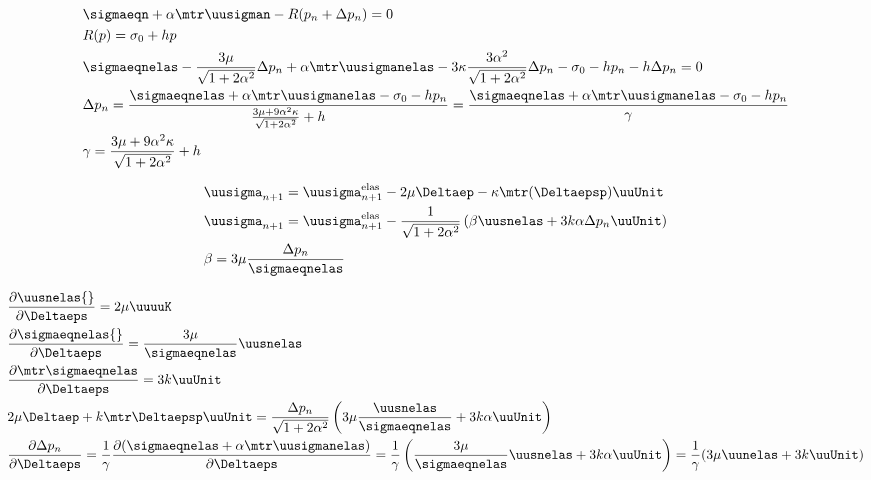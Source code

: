 \documentclass[12pt]{article}
\begin{document}
\begin{align}
    & \sigmaeqn + \alpha \mtr \uusigman - R(p_n + \Delta p_n) = 0 \\
    & R(p) = \sigma_0 + h p \\
    & \sigmaeqnelas - \frac{3\mu}{\sqrt{1 + 2\alpha^2}}\Delta p_n + \alpha \mtr \uusigmanelas - 3\kappa \frac{3\alpha^2}{\sqrt{1 + 2\alpha^2}} \Delta p_n - \sigma_0 - h p_n - h \Delta p_n = 0 \\
    & \Delta p_n = \frac{ \sigmaeqnelas + \alpha \mtr \uusigmanelas - \sigma_0 - h p_n}{ \frac{3\mu + 9\alpha^2\kappa}{\sqrt{1 + 2\alpha^2}} + h} = \frac{ \sigmaeqnelas + \alpha \mtr \uusigmanelas - \sigma_0 - h p_n}{ \gamma } \\
    & \gamma = \frac{3\mu + 9\alpha^2\kappa}{\sqrt{1 + 2\alpha^2}} + h
\end{align}

\begin{align}
    & \uusigma_{n+1} = \uusigma_{n+1}^\text{elas} - 2\mu \Deltaep - \kappa \mtr (\Deltaepsp) \uuUnit \\
    & \uusigma_{n+1} = \uusigma_{n+1}^\text{elas} - \frac{1}{\sqrt{1 + 2\alpha^2}}\left( \beta \uusnelas + 3k\alpha \Delta p_n \uuUnit \right) \\
    & \beta = 3\mu\frac{\Delta p_n}{\sigmaeqnelas} 
\end{align}

\begin{align}
    & \frac{\partial \uusnelas{}}{\partial \Deltaeps} = 2\mu \uuuuK\\
    & \frac{\partial \sigmaeqnelas{}}{\partial \Deltaeps} = \frac{3\mu}{\sigmaeqnelas}\uusnelas \\
    & \frac{\partial\mtr\sigmaeqnelas}{\partial\Deltaeps} = 3k\uuUnit \\
    & 2\mu\Deltaep + k\mtr\Deltaepsp\uuUnit = \frac{\Delta p_n}{\sqrt{1 + 2\alpha^2}} \left( 3\mu \frac{\uusnelas}{\sigmaeqnelas} + 3k\alpha \uuUnit  \right) \\
    & \frac{\partial\Delta p_n}{\partial\Deltaeps} = \frac{1}{\gamma} \frac{\partial(\sigmaeqnelas + \alpha \mtr \uusigmanelas)}{\partial\Deltaeps} = \frac{1}{\gamma} \left( \frac{3\mu}{\sigmaeqnelas}\uusnelas + 3k\alpha\uuUnit \right) = \frac{1}{\gamma}(3\mu \uunelas + 3k\uuUnit)
\end{align}
\end{document}
